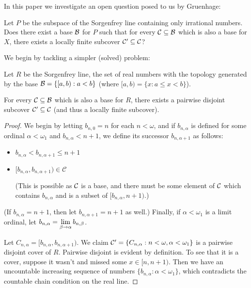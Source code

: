 



In this paper we investigate an open question posed to us by Gruenhage:

\begin{question}
Let $P$ be the subspace of the Sorgenfrey line containing only irrational numbers. Does there exist a base $\mathcal{B}$ for $P$ such that for every $\mathcal{C}\subseteq\mathcal{B}$ which is also a base for $X$, there exists a locally finite subcover $\mathcal{C}'\subseteq\mathcal{C}$?
\end{question}

We begin by tackling a simpler (solved) problem:

\begin{proposition}
Let $R$ be the Sorgenfrey line, the set of real numbers with the topology generated by the base $\mathcal{B} = \{[a,b): a<b\}$ (where $[a,b) = \{x : a\leq x < b\}$).

For every $\mathcal{C}\subseteq\mathcal{B}$ which is also a base for $R$, there exists a pairwise disjoint subcover $\mathcal{C}'\subseteq\mathcal{C}$ (and thus a locally finite subcover).
\end{proposition}

\begin{proof}
We begin by letting $b_{n,0}=n$ for each $n<\omega$, and if $b_{n,\alpha}$ is defined for some ordinal $\alpha<\omega_1$ and $b_{n,\alpha}<n+1$, we define its successor $b_{n,\alpha+1}$ as follows:
  \begin{itemize}
    \item $b_{n,\alpha} < b_{n,\alpha+1} \leq n+1$
    \item $[b_{n,\alpha},b_{n,\alpha+1})\in \mathcal{C}$ 

    (This is possible as $\mathcal{C}$ is a base, and there must be some element of $\mathcal{C}$ which contains $b_{n,\alpha}$ and is a subset of $[b_{n,\alpha},n+1)$.)
  \end{itemize}
(If $b_{n,\alpha}=n+1$, then let $b_{n,\alpha+1}=n+1$ as well.) Finally, if $\alpha<\omega_1$ is a limit ordinal, let $\displaystyle b_{n,\alpha} = \lim_{\beta\to\alpha}b_{n,\beta}$.

Let $C_{n,\alpha} = [b_{n,\alpha},b_{n,\alpha+1})$. We claim $\mathcal{C}' = \{C_{n,\alpha} : n<\omega,\alpha<\omega_1\}$ is a pairwise disjoint cover of $R$. Pairwise disjoint is evident by definition. To see that it is a cover, suppose it wasn't and missed some $x\in[n,n+1)$. Then we have an uncountable increasing sequence of numbers $\{b_{n,\alpha}:\alpha<\omega_1\}$, which contradicts the countable chain condition on the real line.
\end{proof}

